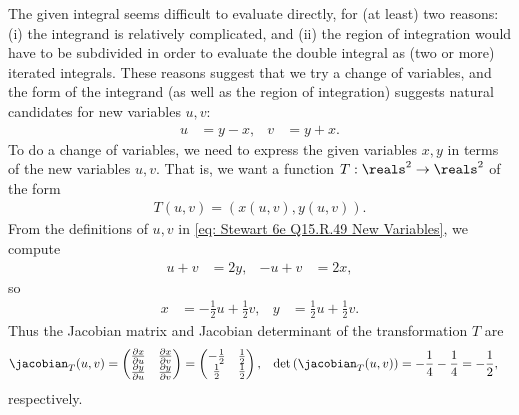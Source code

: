 {The given integral seems difficult to evaluate directly, for (at least) two reasons: (i) the integrand is relatively complicated, and (ii) the region of integration would have to be subdivided in order to evaluate the double integral as (two or more) iterated integrals. These reasons suggest that we try a change of variables, and the form of the integrand (as well as the region of integration) suggests natural candidates for new variables $u,v$:
\begin{align}
u
&=
y - x,
&
v
&=
y + x.%
\label{eq: Stewart 6e Q15.R.49 New Variables}
\end{align}
To do a change of variables, we need to express the given variables $x,y$ in terms of the new variables $u,v$. That is, we want a function $T: \reals^{2} \rightarrow \reals^{2}$ of the form
\begin{align*}
T(u,v)
=
\left(x(u,v),y(u,v)\right).
\end{align*}
From the definitions of $u,v$ in \eqref{eq: Stewart 6e Q15.R.49 New Variables}, we compute
\begin{align*}
u + v
&=
2 y,
&
-u + v
&=
2 x,
\end{align*}
so
\begin{align*}
x
&=
-\frac{1}{2} u + \frac{1}{2} v,
&
y
&=
\frac{1}{2} u + \frac{1}{2} v.
\end{align*}
Thus the Jacobian matrix and Jacobian determinant of the transformation $T$ are
\begin{align*}
\jacobian_{T}(u,v)
&=
\begin{pmatrix}
\frac{\partial x}{\partial u}	&	\frac{\partial x}{\partial v}	\\
\frac{\partial y}{\partial u}	&	\frac{\partial y}{\partial v}
\end{pmatrix}
=
\begin{pmatrix}
-\frac{1}{2}	&	\frac{1}{2}	\\
\frac{1}{2}		&	\frac{1}{2}
\end{pmatrix}
,
&
\det\left(\jacobian_{T}(u,v)\right)
&=
-\frac{1}{4} - \frac{1}{4}
=
-\frac{1}{2},
\end{align*}
respectively.

}
